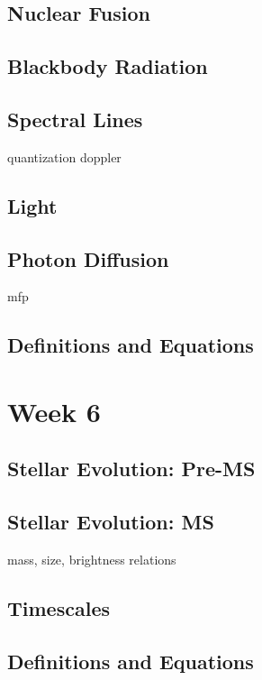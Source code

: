 \documentclass[a4paper,10pt]{article}
\begin{document}
\subsection{Nuclear Fusion}

\subsection{Blackbody Radiation}

\subsection{Spectral Lines}
quantization
doppler

\subsection{Light}

\subsection{Photon Diffusion}
mfp

\subsection{Definitions and Equations}



\newpage
\section{Week 6}

\subsection{Stellar Evolution: Pre-MS}

\subsection{Stellar Evolution: MS}
mass, size, brightness relations

\subsection{Timescales}

\subsection{Definitions and Equations}
\end{document}
